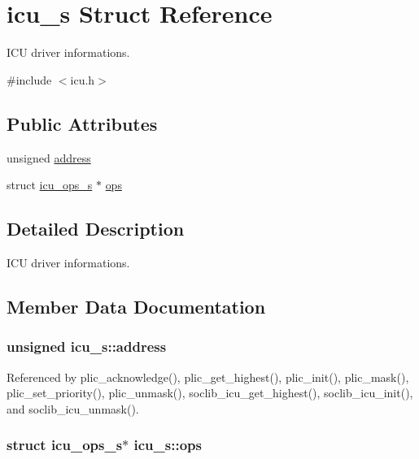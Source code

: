 \hypertarget{structicu__s}{\section{icu\-\_\-s Struct Reference}
\label{structicu__s}
}


I\-C\-U driver informations.  




{\ttfamily \#include $<$icu.\-h$>$}

\subsection*{Public Attributes}
\begin{DoxyCompactItemize}
\item 
unsigned \hyperlink{structicu__s_a4ad14d6fcd630faa41a55ed2037bcf8f}{address}
\item 
struct \hyperlink{structicu__ops__s}{icu\-\_\-ops\-\_\-s} $\ast$ \hyperlink{structicu__s_a7f989a94a922fa1c782cfcf7547bd8c5}{ops}
\end{DoxyCompactItemize}


\subsection{Detailed Description}
I\-C\-U driver informations. 

\subsection{Member Data Documentation}
\hypertarget{structicu__s_a4ad14d6fcd630faa41a55ed2037bcf8f}{
\subsubsection[{address}]{\setlength{\rightskip}{0pt plus 5cm}unsigned icu\-\_\-s\-::address}}\label{structicu__s_a4ad14d6fcd630faa41a55ed2037bcf8f}


Referenced by plic\-\_\-acknowledge(), plic\-\_\-get\-\_\-highest(), plic\-\_\-init(), plic\-\_\-mask(), plic\-\_\-set\-\_\-priority(), plic\-\_\-unmask(), soclib\-\_\-icu\-\_\-get\-\_\-highest(), soclib\-\_\-icu\-\_\-init(), and soclib\-\_\-icu\-\_\-unmask().

\hypertarget{structicu__s_a7f989a94a922fa1c782cfcf7547bd8c5}{
\subsubsection[{ops}]{\setlength{\rightskip}{0pt plus 5cm}struct {\bf icu\-\_\-ops\-\_\-s}$\ast$ icu\-\_\-s\-::ops}}\label{structicu__s_a7f989a94a922fa1c782cfcf7547bd8c5}


